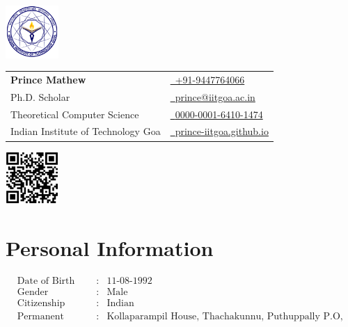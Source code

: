\documentclass[a4paper,11pt]{article}
\makeatletter
\newcommand{\name}{Prince Mathew} %
\newcommand{\course}{Ph.D. Scholar} %
\newcommand{\phone}{9447764066} %
\newcommand{\emaila}{prince@iitgoa.ac.in} %
\makeatother
\begin{document}
\selectfont


\parbox{2.35cm}{%
\vspace{.3cm}
\includegraphics[width=2cm,clip]{iitgoa.png}
}
\parbox{\dimexpr\linewidth-5.15cm\relax}{
\begin{tabularx}{\linewidth}{L B} \\
  \textbf{\Large \name} & \href{tel:+91 9447 764 066} {\raisebox{0.0\height}{\footnotesize \faPhone}\ +91-\phone}\\
  {\course} & \href{mailto:\emaila}{\raisebox{0.0\height}{\footnotesize \faEnvelope}\ {\emaila}} \\
  Theoretical Computer Science &  \href{https://orcid.org/0000-0001-6410-1474}{\raisebox{0.0\height}{\footnotesize \faOrcid}\ {0000-0001-6410-1474}}\\ 
  {Indian Institute of Technology Goa}  &  \href{https://prince-iitgoa.github.io/}{\raisebox{0.0\height}{\footnotesize \faGithub}\ {prince-iitgoa.github.io}} \\
\end{tabularx}
}
\parbox{2.35cm}{%
\vspace{.5cm}
\includegraphics[width=2cm,clip]{PrinceWebpage.png}
}


\section{{\footnotesize \faUser}\textbf{ Personal Information}}
\vspace{-5.5mm}
{\singlespacing \begin{align*}
&\text{Date of Birth} &:& \text{11-08-1992}\\
&\text{Gender} &:& \text{Male}\\
&\text{Citizenship} &:& \text{Indian}\\
&\text{Permanent Address} &:& \text{Kollaparampil House, Thachakunnu, Puthuppally P.O, Kottayam, PIN - 686011}
\end{align*}}
\vspace{-6.5mm}
\end{document}
